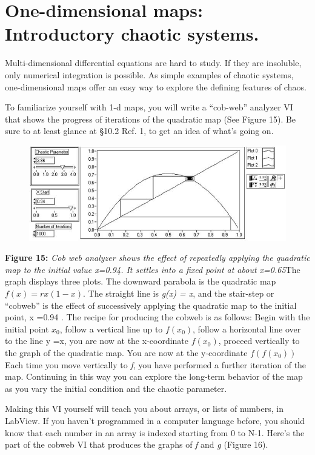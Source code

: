 \documentclass{../lab}
\begin{document}
\section{One-dimensional maps: Introductory chaotic systems.}

Multi-dimensional differential equations are hard to study. If they are insoluble, only numerical integration is possible. As simple examples of chaotic systems, one-dimensional maps offer an easy way to explore the defining features of chaos.

To familiarize yourself with 1-d maps, you will write a ``cob-web'' analyzer VI that shows the progress of iterations of the quadratic map (See Figure 15). Be sure to at least glance at §10.2 Ref. 1, to get an idea of what's going on.


\begin{figure}[h]
    \centering
    \href{http://experimentationlab.berkeley.edu/sites/default/files/images/Nldimage070.jpg}{\includegraphics[width=0.5\linewidth]{images/Nldimage070.jpg}}
    \caption{}
    \label{fig:Nldimage070}
\end{figure}

\textbf{Figure 15:} \emph{Cob web analyzer shows the effect of repeatedly applying the quadratic map to the initial value x=0.94. It settles into a fixed point at about x=0.65}The graph displays three plots. The downward parabola is the quadratic map $ f(x)=rx(1-x) $. The straight line is \emph{g(x) = x}, and the stair-step or ``cobweb'' is the effect of successively applying the quadratic map to the initial point, x =0.94 . The recipe for producing the cobweb is as follows: Begin with the initial point $ x_0 $, follow a vertical line up to $ f(x_0) $, follow a horizontal line over to the line y =x, you are now at the x-coordinate $ f(x_0) $, proceed vertically to the graph of the quadratic map. You are now at the y-coordinate $ f(f(x_0)) $ Each time you move vertically to \emph{f}, you have performed a further iteration of the map. Continuing in this way you can explore the long-term behavior of the map as you vary the initial condition and the chaotic parameter.

Making this VI yourself will teach you about arrays, or lists of numbers, in LabView. If you haven't programmed in a computer language before, you should know that each number in an array is indexed starting from 0 to N-1. Here's the part of the cobweb VI that produces the graphs of \emph{f} and \emph{g} (Figure 16).
\end{document}
